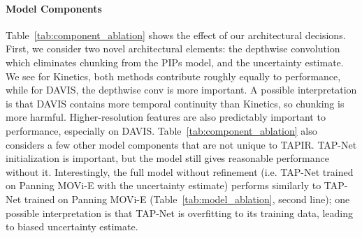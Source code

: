 \documentclass[10pt,twocolumn,letterpaper]{article}
\begin{document}
\begin{table}[t]
\caption{\textbf{Model ablation by removing one major component at a time.} -No Depthwise Conv uses a MLP-Mixer on a chunked video similar to PIPs. -No Uncertainty Estimate uses the losses directly as described in TAP-Net. -No Higher Res Feature uses only 4 pyramid levels in iterative refinement and has no features at stride 4. -No TAP-Net Initialization uses a constant initialization for iterative refinement. All the components contribute non-trivially to the performance of the model.}
\label{tab:component_ablation}
\end{table}

\paragraph{Model Components} Table~\ref{tab:component_ablation} shows the effect of our architectural decisions. First, we consider two novel architectural elements: the depthwise convolution which eliminates chunking from the PIPs model, and the uncertainty estimate. We see for Kinetics, both methods contribute roughly equally to performance, while for DAVIS, the depthwise conv is more important.  A possible interpretation is that DAVIS contains more temporal continuity than Kinetics, so chunking is more harmful.  
Higher-resolution features are also predictably important to performance, especially on DAVIS.  Table~\ref{tab:component_ablation} also considers a few other model components that are not unique to TAPIR.  TAP-Net initialization is important, but the model still gives reasonable performance without it.  Interestingly, the full model without refinement (i.e. TAP-Net trained on Panning MOVi-E with the uncertainty estimate) performs similarly to TAP-Net trained on Panning MOVi-E (Table~\ref{tab:model_ablation}, second line); one possible interpretation is that TAP-Net is overfitting to its training data, leading to biased uncertainty estimate.  
\end{document}
